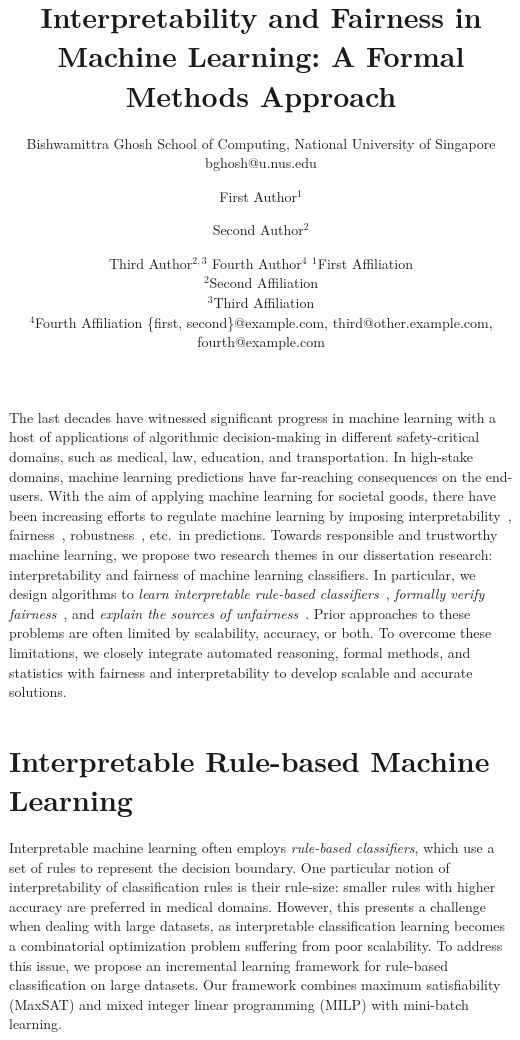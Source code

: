 \documentclass{article}
\title{Interpretability and Fairness in Machine Learning: A Formal Methods Approach}
\author{
    Bishwamittra Ghosh
    \affiliations
    School of Computing, National University of Singapore
    \emails
   bghosh@u.nus.edu
}
\author{
First Author$^1$
\and
Second Author$^2$\and
Third Author$^{2,3}$\And
Fourth Author$^4$
\affiliations
$^1$First Affiliation\\
$^2$Second Affiliation\\
$^3$Third Affiliation\\
$^4$Fourth Affiliation
\emails
\{first, second\}@example.com,
third@other.example.com,
fourth@example.com
}
\begin{document}
\maketitle


The last decades have witnessed significant progress in machine learning with a host of applications of algorithmic decision-making in different safety-critical domains, such as medical, law, education, and transportation. In high-stake domains,  machine learning predictions have far-reaching consequences on the end-users. With the aim of applying machine learning for societal goods, there have been increasing efforts to regulate machine learning by imposing interpretability~\cite{rudin2022interpretable}, fairness~\cite{barocas2017fairness}, robustness~\cite{rauber2017foolbox},  etc.\ in predictions. Towards responsible and trustworthy machine learning, we propose two research themes in our dissertation research: interpretability and fairness of machine learning classifiers. In particular, we design algorithms to \textit{learn interpretable rule-based classifiers}~\cite{ghosh22efficient,ghosh2019incremental,ghosh2020classification}, \textit{formally verify fairness}~\cite{ghosh2021justicia,ghosh2022algorithmic}, and \textit{explain the sources of unfairness}~\cite{ghosh2022how}. Prior approaches to these problems are often limited by scalability, accuracy, or both. To overcome these limitations, we closely integrate automated reasoning, formal methods, and statistics with fairness and interpretability to develop scalable and accurate solutions.


\section{Interpretable Rule-based Machine Learning}

Interpretable machine learning often employs \textit{rule-based classifiers}, which use a set of rules to represent the decision boundary. One particular notion of interpretability of classification rules is their rule-size: smaller rules with higher accuracy are preferred in medical domains. However, this presents a challenge when dealing with large datasets, as interpretable classification learning becomes a combinatorial optimization problem suffering from poor scalability. To address this issue, we propose an incremental learning framework for rule-based classification on large datasets. Our framework combines maximum satisfiability (MaxSAT) and mixed integer linear programming (MILP) with mini-batch learning.
\end{document}
